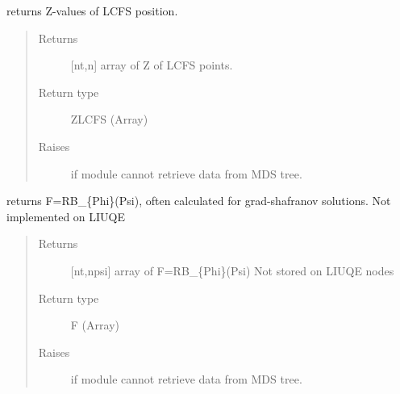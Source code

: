 \documentclass[letterpaper,10pt,english]{sphinxmanual}
\begin{document}
\begin{fulllineitems}
\begin{fulllineitems}
\begin{quote}
\begin{description}
\end{description}\end{quote}

\end{fulllineitems}


\begin{fulllineitems}
\label{\detokenize{eqtools:eqtools.TCVLIUQE.TCVLIUQETree.getZLCFS}}
returns Z-values of LCFS position.
\begin{quote}\begin{description}
\item[{Returns}] \leavevmode
{[}nt,n{]} array of Z of LCFS points.

\item[{Return type}] \leavevmode
ZLCFS (Array)

\item[{Raises}] \leavevmode
{} \textendash{} if module cannot retrieve data from MDS tree.

\end{description}\end{quote}

\end{fulllineitems}


\begin{fulllineitems}
\label{\detokenize{eqtools:eqtools.TCVLIUQE.TCVLIUQETree.getF}}
returns F=RB\_\{Phi\}(Psi), often calculated for grad-shafranov
solutions. Not implemented on LIUQE
\begin{quote}\begin{description}
\item[{Returns}] \leavevmode
{[}nt,npsi{]} array of F=RB\_\{Phi\}(Psi)
Not stored on LIUQE nodes

\item[{Return type}] \leavevmode
F (Array)

\item[{Raises}] \leavevmode
{} \textendash{} if module cannot retrieve data from MDS tree.


\end{description}
\end{quote}
\end{fulllineitems}
\end{fulllineitems}
\end{document}
